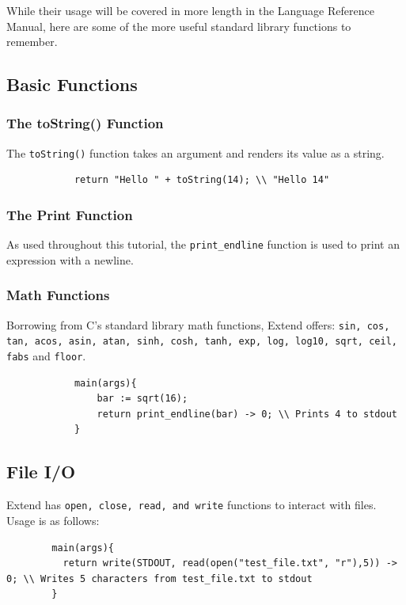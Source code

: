 \medskip \noindent
While their usage will be covered in more length in the Language Reference Manual, here are some of the more useful standard library functions to remember.
	\subsection{Basic Functions}
		\subsubsection{The toString() Function}
		The \texttt{toString()} function takes an argument and renders its value as a string.

		\begin{lstlisting}
			return "Hello " + toString(14); \\ "Hello 14"
		\end{lstlisting}

		\subsubsection{The Print Function}
		As used throughout this tutorial, the \texttt{print\_endline} function is used to print an expression with a newline.

		\subsubsection{Math Functions}
		Borrowing from C's standard library math functions, Extend offers: \texttt{sin, cos, tan, acos, asin, atan, sinh, cosh, tanh, exp, log, log10, sqrt, ceil, fabs} and \texttt{floor}.

		\begin{lstlisting}
			main(args){
				bar := sqrt(16);
				return print_endline(bar) -> 0; \\ Prints 4 to stdout
			}
		\end{lstlisting}

	\subsection{File I/O}
	Extend has \texttt{open, close, read, and write} functions to interact with files. Usage is as follows:

	\begin{lstlisting}
		main(args){
		  return write(STDOUT, read(open("test_file.txt", "r"),5)) -> 0; \\ Writes 5 characters from test_file.txt to stdout
		}
	\end{lstlisting}

